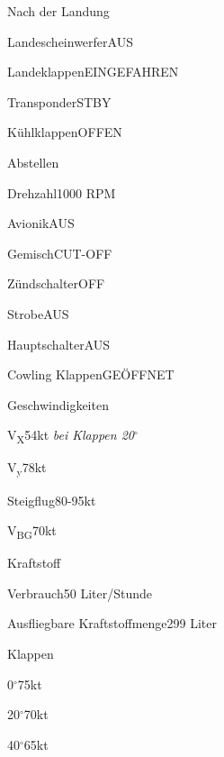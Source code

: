 \documentclass[12pt]{article}
\begin{document}
  \begin{checklist}{Nach der Landung}
    \item{Landescheinwerfer}{AUS}
    \item{Landeklappen}{EINGEFAHREN}
    \item{Transponder}{STBY}
    \item{Kühlklappen}{OFFEN}
  \end{checklist}

  \begin{checklist}{Abstellen}
    \item{Drehzahl}{1000 RPM}
    \item{Avionik}{AUS}
    \item{Gemisch}{CUT-OFF}
    \item{Zündschalter}{OFF}
    \item{Strobe}{AUS}
    \item{Hauptschalter}{AUS}
    \item{Cowling Klappen}{GEÖFFNET}
  \end{checklist}

  \begin{checklist}{Geschwindigkeiten}
    \item{V\textsubscript{X}}{54kt \textit{bei Klappen 20$^{\circ}$}}
    \item{V\textsubscript{y}}{78kt}
    \item{Steigflug}{80-95kt}
    \item{V\textsubscript{BG}}{70kt}
  \end{checklist}
  \begin{checklist}{Kraftstoff}
    \item{Verbrauch}{50 Liter/Stunde}
    \item{Ausfliegbare Kraftstoffmenge}{299 Liter}
  \end{checklist}
  \begin{checklist}{Klappen}
    \item{0$^{\circ}$}{75kt}
    \item{20$^{\circ}$}{70kt}
    \item{40$^{\circ}$}{65kt}
  \end{checklist}
\end{document}
